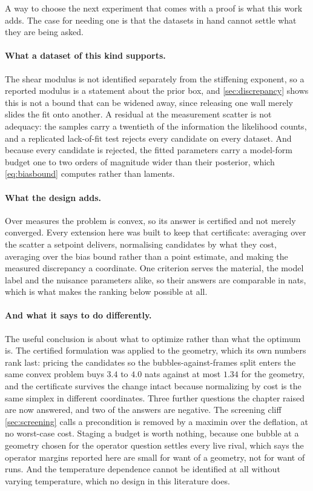 \documentclass[10pt]{article}
\begin{document}
A way to choose the next experiment that comes with a proof is what this work adds. The case for
needing one is that the datasets in hand cannot settle what they are being asked.

\paragraph{What a dataset of this kind supports.} The shear modulus
is not identified separately from the stiffening exponent, so a reported modulus is a statement
about the prior box, and \cref{sec:discrepancy} shows this is not a bound that can be widened
away, since releasing one wall merely slides the fit onto another. A residual at the measurement
scatter is not adequacy: the samples carry a twentieth of the information the likelihood counts,
and a replicated lack-of-fit test rejects every candidate on every dataset. And because every
candidate is rejected, the fitted parameters carry a model-form budget one to two orders of
magnitude wider than their posterior, which \eqref{eq:biasbound} computes rather than laments.

\paragraph{What the design adds.} Over measures the problem is convex, so its answer is certified
and not merely converged. Every extension here was built to keep that
certificate: averaging over the scatter a setpoint delivers, normalising candidates by what they
cost, averaging over the bias bound rather than a point estimate, and making the measured
discrepancy a coordinate. One criterion serves the material, the model label and the nuisance
parameters alike, so their answers are comparable in nats, which is what makes the ranking
below possible at all.

\paragraph{And what it says to do differently.} The useful conclusion is about what to optimize
rather than what the optimum is. The certified formulation was applied to the geometry, which its
own numbers rank last:
pricing the candidates so the bubbles-against-frames split enters the same convex problem buys
$3.4$ to $4.0$ nats against at most $1.34$ for the geometry, and the certificate survives the
change intact because normalizing by cost is the same simplex in different coordinates. Three
further questions the chapter raised are now answered, and two of the answers are negative. The
screening cliff \cref{sec:screening} calls a precondition is removed by a maximin over the
deflation, at no worst-case cost. Staging a budget is worth nothing, because one bubble at a
geometry chosen for the operator question settles every live rival, which says the operator
margins reported here are small for want of a geometry, not for want of runs. And the
temperature dependence cannot be identified at all without varying temperature, which no design
in this literature does.
\end{document}
